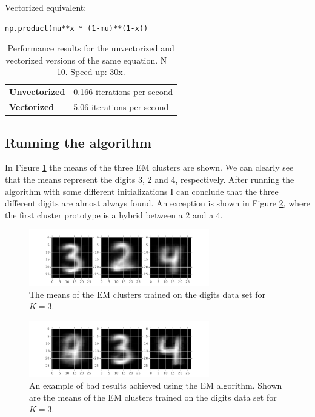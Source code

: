 \documentclass[paper=a4, fontsize=10pt]{scrartcl} %
\numberwithin{equation}{section} %
\numberwithin{figure}{section} %
\numberwithin{table}{section} %
\begin{document}
Vectorized equivalent:
\begin{verbatim}
np.product(mu**x * (1-mu)**(1-x))
\end{verbatim}

\begin{table}[h!]
	\centering
	\begin{tabular}{|l|l|}
		\hline
		\textbf{Unvectorized} & 0.166 iterations per second \\
		\textbf{Vectorized} & 5.06 iterations per second \\
		\hline
	\end{tabular}
	\caption{Performance results for the unvectorized and vectorized versions of the same equation. N = 10. Speed up: 30x.}
	\label{vectorize}
\end{table}

\subsection{Running the algorithm}
In Figure \ref{means_digits} the means of the three EM clusters are shown. We can clearly see that the means represent the digits 3, 2 and 4, respectively. After running the algorithm with some different initializations I can conclude that the three different digits are almost always found. An exception is shown in Figure \ref{bad_digits}, where the first cluster prototype is a hybrid between a 2 and a 4.

\begin{figure}[H]
	\centering
	\includegraphics[width=0.7\textwidth]{means_digits.pdf}
	\caption{The means of the EM clusters trained on the digits data set for $K = 3$.}
	\label{means_digits}
\end{figure}

\begin{figure}[H]
	\centering
	\includegraphics[width=0.7\textwidth]{bad.pdf}
	\caption{An example of bad results achieved using the EM algorithm. Shown are the means of the EM clusters trained on the digits data set for $K = 3$.}
	\label{bad_digits}
\end{figure}
\end{document}
